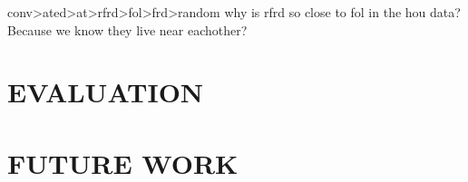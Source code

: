 \documentclass{sig-alternate}
\begin{document}
conv>ated>at>rfrd>fol>frd>random
why is rfrd so close to fol in the hou data? Because we know they live near eachother?








\section{EVALUATION}
\section{FUTURE WORK}


 
\end{document}
